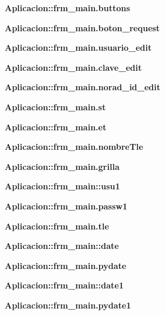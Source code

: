 \begin{DoxyCompactItemize}
{\bf \-Aplicacion\-::frm\-\_\-main.\-buttons}
\item 
{\bf \-Aplicacion\-::frm\-\_\-main.\-boton\-\_\-request}
\item 
{\bf \-Aplicacion\-::frm\-\_\-main.\-usuario\-\_\-edit}
\item 
{\bf \-Aplicacion\-::frm\-\_\-main.\-clave\-\_\-edit}
\item 
{\bf \-Aplicacion\-::frm\-\_\-main.\-norad\-\_\-id\-\_\-edit}
\item 
{\bf \-Aplicacion\-::frm\-\_\-main.\-st}
\item 
{\bf \-Aplicacion\-::frm\-\_\-main.\-et}
\item 
{\bf \-Aplicacion\-::frm\-\_\-main.\-nombre\-Tle}
\item 
{\bf \-Aplicacion\-::frm\-\_\-main.\-grilla}
\item 
{\bf \-Aplicacion\-::frm\-\_\-main\-::usu1}
\item 
{\bf \-Aplicacion\-::frm\-\_\-main.\-passw1}
\item 
{\bf \-Aplicacion\-::frm\-\_\-main.\-tle}
\item 
{\bf \-Aplicacion\-::frm\-\_\-main\-::date}
\item 
{\bf \-Aplicacion\-::frm\-\_\-main.\-pydate}
\item 
{\bf \-Aplicacion\-::frm\-\_\-main\-::date1}
\item 
{\bf \-Aplicacion\-::frm\-\_\-main.\-pydate1}
\end{DoxyCompactItemize}
